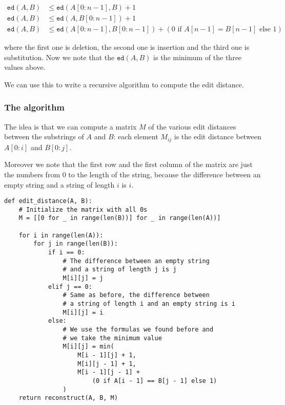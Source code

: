\documentclass[12pt]{extarticle}
\begin{document}
\begin{align}
    \texttt{ed}(A, B) & \leq \texttt{ed}(A[0:n-1], B) + 1                                                      \\
    \texttt{ed}(A, B) & \leq \texttt{ed}(A, B[0:n-1]) + 1                                                      \\
    \texttt{ed}(A, B) & \leq \texttt{ed}(A[0:n-1], B[0:n-1]) + (0 \text{ if } A[n-1] = B[n-1] \text{ else } 1)
\end{align}

where the first one is deletion, the second one is insertion and the third one is substitution.
Now we note that the $\texttt{ed}(A, B)$ is the minimum of the three values above.

We can use this to write a recursive algorithm to compute the edit distance.

\subsubsection{The algorithm}

The idea is that we can compute a matrix $M$ of the various edit distances between the substrings of $A$ and $B$: each element $M_{ij}$ is the edit distance between $A[0:i]$ and $B[0:j]$.

Moreover we note that the first row and the first column of the matrix are just the numbers from 0 to the length of the string, because the difference between an empty string and a string of length $i$ is $i$.

\begin{verbatim}
def edit_distance(A, B):
    # Initialize the matrix with all 0s
    M = [[0 for _ in range(len(B))] for _ in range(len(A))]

    for i in range(len(A)):
        for j in range(len(B)):
            if i == 0:
                # The difference between an empty string
                # and a string of length j is j
                M[i][j] = j
            elif j == 0:
                # Same as before, the difference between
                # a string of length i and an empty string is i
                M[i][j] = i
            else:
                # We use the formulas we found before and
                # we take the minimum value
                M[i][j] = min(
                    M[i - 1][j] + 1,
                    M[i][j - 1] + 1,
                    M[i - 1][j - 1] +
                        (0 if A[i - 1] == B[j - 1] else 1)
                )
    return reconstruct(A, B, M)
\end{verbatim}
\end{document}
